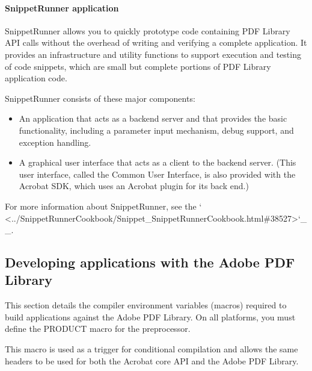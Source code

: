 \documentclass[letterpaper,12pt,english,openany,oneside]{sphinxmanual}
\begin{document}
\paragraph{SnippetRunner application}
\label{\detokenize{Plugins_CreatingSimplePlug:snippetrunner-application}}
SnippetRunner allows you to quickly prototype code containing PDF Library API calls without the overhead of writing and verifying a complete application. It provides an infrastructure and utility functions to support execution and testing of code snippets, which are small but complete portions of PDF Library application code.

SnippetRunner consists of these major components:
\begin{itemize}
\item {} 
An application that acts as a back\sphinxhyphen{}end server and that provides the basic functionality, including a parameter input mechanism, debug support, and exception handling.

\item {} 
A graphical user interface that acts as a client to the back\sphinxhyphen{}end server. (This user interface, called the Common User Interface, is also provided with the Acrobat SDK, which uses an Acrobat plugin for its back end.)

\end{itemize}

For more information about SnippetRunner, see the ` <../SnippetRunnerCookbook/Snippet\_SnippetRunnerCookbook.html\#38527>`\_\_.


\subsection{Developing applications with the Adobe PDF Library}
\label{\detokenize{Plugins_CreatingSimplePlug:developing-applications-with-the-adobe-pdf-library}}
This section details the compiler environment variables (macros) required to build applications against the Adobe PDF Library. On all platforms, you must define the PRODUCT macro for the preprocessor.

\begin{sphinxVerbatim}[commandchars=\\\{\}]
\end{sphinxVerbatim}

This macro is used as a trigger for conditional compilation and allows the same headers to be used for both the Acrobat core API and the Adobe PDF Library.
\end{document}
